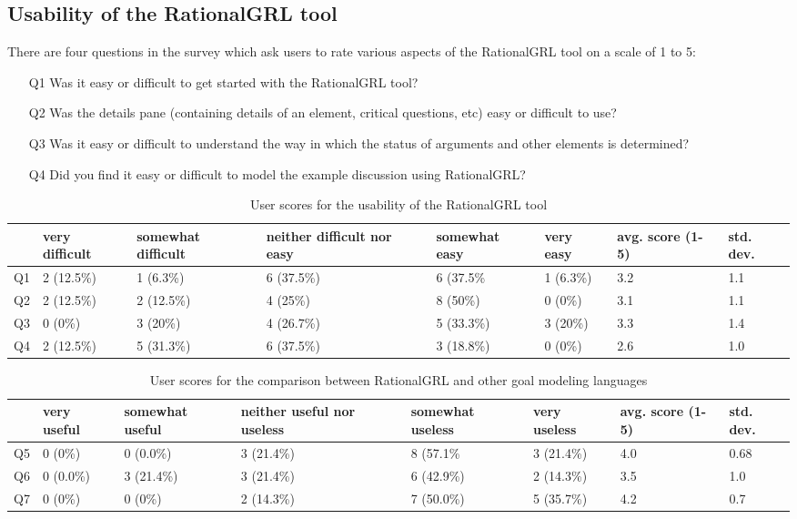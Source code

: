 \subsection{Usability of the RationalGRL tool}

There are four questions in the survey which ask users to rate various aspects of the RationalGRL tool on a scale of 1 to 5:
\begin{itemize}
\item[Q1] Was it easy or difficult to get started with the RationalGRL tool?
\item[Q2] Was the details pane (containing details of an element, critical questions, etc) easy or difficult to use?
\item[Q3] Was it easy or difficult to understand the way in which the status of arguments and other elements is determined?
\item[Q4] Did you find it easy or difficult to model the example discussion using RationalGRL?
\end{itemize}

\begin{table*}[t]
\centering
\begin{tabularx}{0.95\textwidth}{l|l|l|l|l|l|l|l}
& very difficult & somewhat difficult & neither difficult nor easy & somewhat easy & very easy & avg. score (1-5) & std. dev.\\
\hline
Q1 & 2 (12.5\%) & 1 (6.3\%) & 6 (37.5\%) & 6 (37.5\% & 1 (6.3\%) & 3.2 & 1.1\\
Q2 & 2 (12.5\%) & 2 (12.5\%) & 4 (25\%) & 8 (50\%) & 0 (0\%) & 3.1 & 1.1\\
Q3 & 0 (0\%) & 3 (20\%) & 4 (26.7\%) & 5 (33.3\%) & 3 (20\%) & 3.3 & 1.4\\
Q4 & 2 (12.5\%) & 5 (31.3\%) & 6 (37.5\%) & 3 (18.8\%) & 0 (0\%) & 2.6 & 1.0
\end{tabularx}
\caption{User scores for the usability of the RationalGRL tool}
\label{table:survey:table1}
\end{table*}

\begin{table*}[t]
\centering
\begin{tabularx}{0.95\textwidth}{l|l|l|l|l|l|l|l}
& very useful & somewhat useful & neither useful nor useless & somewhat useless & very useless & avg. score (1-5) & std. dev.\\
\hline
Q5 & 0 (0\%) & 0 (0.0\%) & 3 (21.4\%) & 8 (57.1\% & 3 (21.4\%) & 4.0 & 0.68\\
Q6 & 0 (0.0\%) & 3 (21.4\%) & 3 (21.4\%) & 6 (42.9\%) & 2 (14.3\%) & 3.5 & 1.0\\
Q7 & 0 (0\%) & 0 (0\%) & 2 (14.3\%) & 7 (50.0\%) & 5 (35.7\%) & 4.2 & 0.7
\end{tabularx}
\caption{User scores for the comparison between RationalGRL and other goal modeling languages}
\label{table:survey:table2}
\end{table*}

